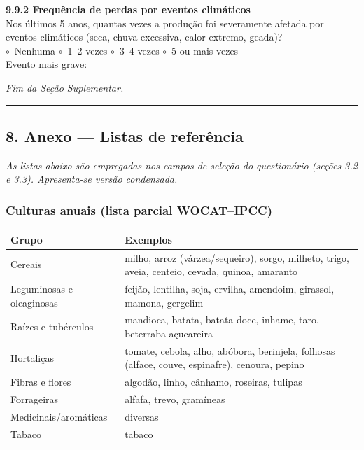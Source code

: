 \medskip\noindent\textbf{9.9.2 Frequência de perdas por eventos climáticos}\\[2pt]
Nos últimos 5 anos, quantas vezes a produção foi severamente afetada por eventos climáticos (seca, chuva excessiva, calor extremo, geada)?\\
$\circ$~Nenhuma \quad $\circ$~1--2 vezes \quad $\circ$~3--4 vezes \quad $\circ$~5 ou mais vezes\\[2pt]
Evento mais grave: \dotfill

\bigskip\noindent\emph{Fim da Seção Suplementar.}

\newpage

\begin{center}\rule{0.5\linewidth}{0.5pt}\end{center}

\subsection{8. Anexo --- Listas de referência}\label{anexo-listas-de-referuxeancia}

\emph{As listas abaixo são empregadas nos campos de seleção do questionário (seções 3.2 e 3.3). Apresenta-se versão condensada.}

\subsubsection{Culturas anuais (lista parcial WOCAT--IPCC)}\label{culturas-anuais-lista-parcial-wocatipcc}

{
\begin{longtable}[]{@{}
  >{\raggedright\arraybackslash}p{}
  >{\raggedright\arraybackslash}p{}@{}}
\toprule\noalign{}
\begin{minipage}[b]{\linewidth}\raggedright
Grupo
\end{minipage} & \begin{minipage}[b]{\linewidth}\raggedright
Exemplos
\end{minipage} \\
\midrule\noalign{}
\endhead
\bottomrule\noalign{}
\endlastfoot
Cereais & milho, arroz (várzea/sequeiro), sorgo, milheto, trigo, aveia, centeio, cevada, quinoa, amaranto \\
Leguminosas e oleaginosas & feijão, lentilha, soja, ervilha, amendoim, girassol, mamona, gergelim \\
Raízes e tubérculos & mandioca, batata, batata-doce, inhame, taro, beterraba-açucareira \\
Hortaliças & tomate, cebola, alho, abóbora, berinjela, folhosas (alface, couve, espinafre), cenoura, pepino \\
Fibras e flores & algodão, linho, cânhamo, roseiras, tulipas \\
Forrageiras & alfafa, trevo, gramíneas \\
Medicinais/aromáticas & diversas \\
Tabaco & tabaco \\
\end{longtable}
}

